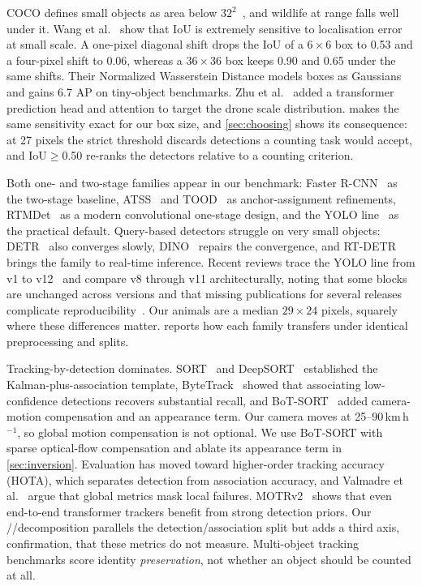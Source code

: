 COCO defines small objects as area below $32^2$~\cite{lin2014coco}, and wildlife at range
falls well under it. Wang et al.~\cite{wang2021nwd} show that IoU is extremely sensitive to localisation error at small scale. A one-pixel
diagonal shift drops the IoU of a $6\times6$ box to 0.53 and a four-pixel shift to 0.06,
whereas a $36\times36$ box keeps 0.90 and 0.65 under the same shifts. Their
Normalized Wasserstein Distance models boxes as Gaussians and gains 6.7 AP on tiny-object
benchmarks. Zhu et al.~\cite{zhu2021tph} added a transformer prediction head and attention
to target the drone scale distribution.  makes the same sensitivity exact
for our box size, and \cref{sec:choosing} shows its consequence: at 27 pixels the strict
threshold discards detections a counting task would accept, and IoU$\geq$0.50 re-ranks the
detectors relative to a counting criterion.

Both one- and two-stage families appear in our benchmark: Faster R-CNN~\cite{ren2015faster}
as the two-stage baseline, ATSS~\cite{zhang2020atss} and TOOD~\cite{feng2021tood} as
anchor-assignment refinements, RTMDet~\cite{lyu2022rtmdet} as a modern convolutional
one-stage design, and the YOLO line~\cite{redmon2016yolo,wang2024yolov9,wang2024yolov10} as
the practical default. Query-based detectors struggle on very small objects: DETR~\cite{carion2020detr}
also converges slowly, DINO~\cite{zhang2023dino} repairs the convergence, and
RT-DETR~\cite{zhao2024rtdetr} brings the family to real-time inference. Recent reviews trace the YOLO line from v1
to v12~\cite{sapkota2025yoloreview} and compare v8 through v11 architecturally, noting that
some blocks are unchanged across versions and that missing publications for several
releases complicate reproducibility~\cite{hidayatullah2025yolov8}. Our animals are a median
$29\times24$ pixels, squarely where these differences matter.  reports
how each family transfers under identical preprocessing and splits.

Tracking-by-detection dominates. SORT~\cite{bewley2016sort} and
DeepSORT~\cite{wojke2017deepsort} established the Kalman-plus-association template,
ByteTrack~\cite{zhang2022bytetrack} showed that associating low-confidence detections
recovers substantial recall, and BoT-SORT~\cite{aharon2022botsort} added camera-motion
compensation and an appearance term. Our camera moves at 25--90\,km\,h$^{-1}$, so global
motion compensation is not optional. We use BoT-SORT with sparse optical-flow compensation
and ablate its appearance term in \cref{sec:inversion}. Evaluation has moved toward
higher-order tracking accuracy (HOTA), which separates detection from association accuracy,
and Valmadre et al.~\cite{valmadre2021local} argue that global metrics mask local failures.
MOTRv2~\cite{zhang2023motrv2} shows that even end-to-end transformer trackers benefit from
strong detection priors. Our \reachedq/\primaryq/\countedq decomposition parallels the
detection/association split but adds a third axis, confirmation, that these metrics do not
measure. Multi-object tracking benchmarks score identity \emph{preservation}, not whether an
object should be counted at all.

